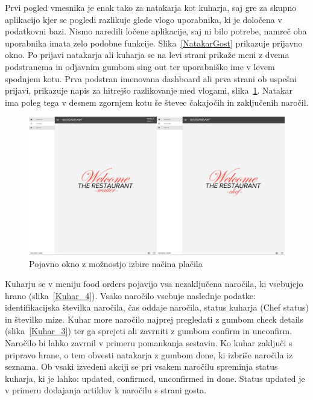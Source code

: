 \documentclass[a4paper, 12pt]{book}
\begin{document}
Prvi pogled vmesnika je enak tako za natakarja kot kuharja, saj gre za skupno aplikacijo kjer se pogledi razlikuje glede vlogo uporabnika, ki je določena v podatkovni bazi. Nismo naredili ločene aplikacije, saj ni bilo potrebe, namreč oba uporabnika imata zelo podobne funkcije. Slika~\ref{NatakarGost} prikazuje prijavno okno. Po prijavi natakarja ali kuharja se na levi strani prikaže meni z dvema podstranema in odjavnim gumbom sing out ter uporabniško ime v levem spodnjem kotu. Prva podstran imenovana dashboard ali prva strani ob uspešni prijavi, prikazuje napis za hitrejšo razlikovanje med vlogami, slika~\ref{Dvapogleda}. Natakar ima poleg tega v desnem zgornjem kotu še števec čakajočih in zaključenih naročil.
\begin{figure}[!htb]
\begin{center}
\includegraphics[width=14cm]{dvapogleda.jpg}
\caption{Pojavno okno z možnostjo izbire načina plačila}
\label{Dvapogleda}
\end{center}
\end{figure}

Kuharju se v meniju food orders pojavijo vsa nezaključena naročila, ki vsebujejo hrano (slika~\ref{Kuhar_4}). Vsako naročilo vsebuje naslednje podatke: identifikacijska številka naročila, čas oddaje naročila, status kuharja (Chef status) in številko mize. Kuhar more naročilo najprej pregledati z gumbom check details (slika~\ref{Kuhar_3}) ter ga sprejeti ali zavrniti z gumbom confirm in unconfirm. Naročilo bi lahko zavrnil v primeru pomankanja sestavin. Ko kuhar zaključi s pripravo hrane, o tem obvesti natakarja z gumbom done, ki izbriše naročila iz seznama. Ob vsaki izvedeni akciji se pri vsakem naročilu spreminja status kuharja, ki je lahko: updated, confirmed, unconfirmed in done. Status updated je v primeru dodajanja artiklov k naročilu s strani gosta.
\end{document}
